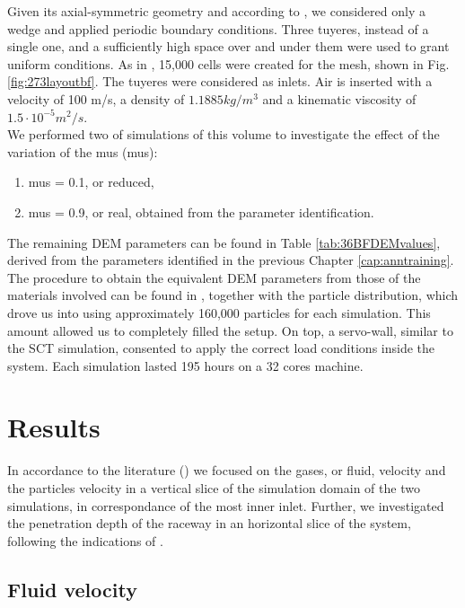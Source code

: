 Given its axial-symmetric geometry and according to \citet{RefWorks:208}, we
considered only a wedge and applied periodic boundary conditions.
Three tuyeres, instead of a single one, and a sufficiently high space over and
under them were used to grant uniform conditions.
As in \citet{RefWorks:208}, 15,000 cells were created for the mesh, shown in
Fig. \ref{fig:273layoutbf}. 
The tuyeres were considered as inlets. Air is inserted with a velocity of 100
m/s, a density of $1.1885 kg/m^3$ and a kinematic viscosity of $1.5 \cdot
10^{-5} m^2/s$.\\
We performed two of simulations of this volume to investigate
the effect of the variation of the \acl{mus} (\acs{mus}):
\begin{enumerate}
  \item{\acs{mus} = 0.1, or reduced,}
  \item{\acs{mus} = 0.9, or real, obtained from the parameter identification.}
\end{enumerate}
The remaining \acs{DEM} parameters can be found in Table
\ref{tab:36BFDEMvalues}, derived from the parameters identified in the previous
Chapter \ref{cap:anntraining}.
The procedure to obtain the equivalent \acs{DEM} parameters from those of the
materials involved can be found in \citet{RefWorks:208}, together with the
particle distribution, which drove us into using approximately 160,000 particles
for each simulation.
This amount allowed us to completely filled the setup.
On top, a servo-wall, similar to the \acs{SCT} simulation, consented to apply
the correct load conditions inside the system.
Each simulation lasted 195 hours on a 32 cores machine.




\section{Results}
\label{sec:resultsbf}

In accordance to the literature (\cite{RefWorks:203, RefWorks:208}) we focused
on the gases, or fluid, velocity and the particles velocity in a vertical slice
of the simulation domain of the two simulations, in correspondance of the most
inner inlet.
Further, we investigated the penetration depth of the raceway in an horizontal
slice of the system, following the indications of \citet{RefWorks:208}.

\subsection{Fluid velocity}
\label{subsec:fluidvelocity}

